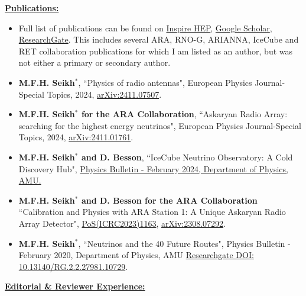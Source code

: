\documentclass[10pt]{report}
\begin{document}
\vspace{2mm}
\begin{large}\textbf{\underline{Publications:}}\end{large}
\begin{itemize}
\item Full list of publications can be found on \href{https://inspirehep.net/authors/2014116}{Inspire HEP}, \href{https://scholar.google.com/citations?user=dSwfpWQAAAAJ&hl=en&authuser=2}{Google Scholar}, \href{https://www.researchgate.net/profile/Mohammad-Ful-Hossain-Seikh}{ResearchGate}. This includes several ARA, RNO-G, ARIANNA, IceCube and RET collaboration publications for which I am listed as an author, but was not either a primary or secondary author.
\item {\bf M.F.H. Seikh$^*$}, ``Physics of radio antennas", European Physics Journal-Special Topics, 2024, \href{https://arxiv.org/abs/2411.07507}{arXiv:2411.07507}.
\item {\bf M.F.H. Seikh$^*$ for the ARA Collaboration}, ``Askaryan Radio Array: searching for the highest energy neutrinos", European Physics Journal-Special Topics, 2024, \href{https://arxiv.org/abs/2411.01761}{arXiv:2411.01761}.
\item {\bf M.F.H. Seikh$^*$ and D. Besson}, ``IceCube Neutrino Observatory: A Cold Discovery Hub", \href{https://drive.google.com/file/d/1YgY4idLIatp-4DYSmV1RUodvJd-XCsf2/view}{Physics Bulletin - February 2024, Department of Physics, AMU.}
\item {\bf M.F.H. Seikh$^*$ and D. Besson for the ARA Collaboration} ``Calibration and Physics with ARA Station 1: A Unique Askaryan Radio Array Detector", \href{https://pos.sissa.it/444/1163/pdf}{PoS(ICRC2023)1163}, \href{https://arxiv.org/abs/2308.07292}{arXiv:2308.07292}.
\item {\bf M.F.H. Seikh$^*$}, ``Neutrinos and the 40 Future Routes", Physics Bulletin - February 2020, Department of Physics, AMU \href{https://www.researchgate.net/publication/340272190_Neutrinos_and_the_40_Future_Routes}{Researchgate DOI: 10.13140/RG.2.2.27981.10729}.
\end{itemize}\vspace{2mm}
\begin{large}\textbf{\underline{Editorial \& Reviewer Experience:}}\end{large}
\end{document}
